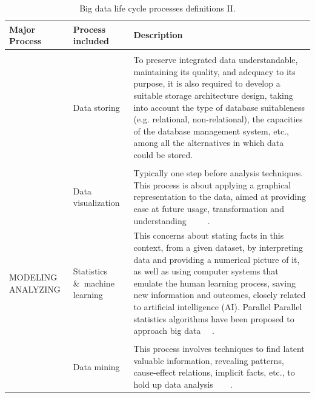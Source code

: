 \begin{table}[H]
    \caption{Big data life cycle processes definitions II.}
    \label{table:big_data_life_cyle_processes_definition_II}
    \centering
    \begin{tabular}{p{4.0cm} p{3.1cm} p{7cm}}
    \toprule
    \textbf{Major Process} & \textbf{Process included} & \textbf{Description} \\ 
    \bottomrule   
    & \\ &  Data storing & To preserve integrated data understandable, maintaining its quality, and
    adequacy to its purpose, it is also required to develop a suitable storage
    architecture design, taking into account the type of database suitableness (e.g. relational, non-relational),
    the capacities of the database management system, etc., among all the alternatives in which data could be stored. ~\cite{ComputingResearchAssociation}
    \\
    & \\ & Data visualization & Typically one step before analysis
    techniques. This process is about applying a graphical representation to
    the data, aimed at providing ease at future usage, transformation and understanding ~\cite{Fayyad2002} ~\cite{Ware2012} ~\cite{Philip2014}.
    \\ 
    MODELING ANALYZING & Statistics \&\ machine learning & This concerns about stating facts in
    this context, from a given dataset, by interpreting data and providing a numerical picture of it, as well as using computer systems that emulate the human learning process, saving new information and outcomes,
    closely related to artificial intelligence (AI). Parallel Parallel statistics algorithms have been proposed to approach big data ~\cite{Ryszard2013}~\cite{PhilipChen2014}.
    \\
    & \\ & Data mining & This process involves techniques to
    find latent valuable information, revealing patterns, cause-effect relations, implicit facts, etc., to hold up
    data analysis ~\cite{Chandrasekar2001} ~\cite{Philip2014} .
    \\
    \bottomrule
\end{tabular}
\end{table}

